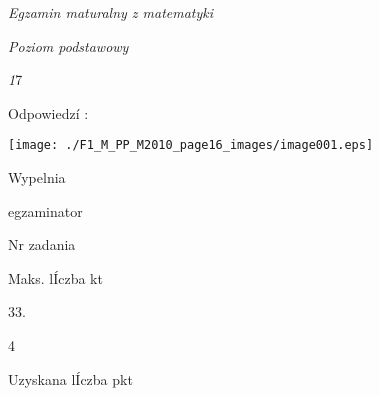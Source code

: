 \documentclass[a4paper,12pt]{article}
\begin{document}
{\it Egzamin maturalny z matematyki}

{\it Poziom podstawowy}

{\it 1}7

Odpowiedzí :
\begin{center}
\texttt{[image: ./F1\_M\_PP\_M2010\_page16\_images/image001.eps]}
\end{center}
Wypelnia

egzaminator

Nr zadania

Maks. lÍczba kt

33.

4

Uzyskana lÍczba pkt
\end{document}
